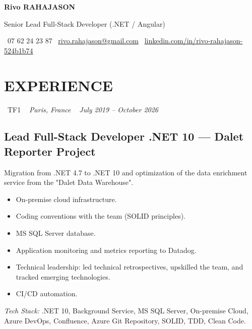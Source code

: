 \documentclass[10pt,a4paper]{article}
\begin{document}
\begin{center}
{\Huge \textbf{\color{ink}Rivo RAHAJASON}}

\vspace{4pt}

{\large \color{primary} Senior Lead Full-Stack Developer (.NET / Angular)}

\vspace{6pt}

\color{darkgray} \faPhone\  07 62 24 23 87 \quad
\color{darkgray} \faEnvelope\ \href{mailto:rivo.rahajason@gmail.com}{rivo.rahajason@gmail.com} \quad
\color{darkgray} \faLinkedin\ \href{https://linkedin.com/in/rivo-rahajason-524b1b74}{linkedin.com/in/rivo-rahajason-524b1b74}

\vspace{22pt}
\end{center}

\section*{EXPERIENCE}

\noindent\textcolor{primary}{ \faBuilding\ TF1} \quad
\textit{ \small \textcolor{darkgray}{ \faMapMarker\ } Paris, France } \hfill
\textit{ \small \textcolor{darkgray}{ \faCalendar\ } July 2019 -- October 2026 }

\vspace{4pt}

\subsection*{Lead Full-Stack Developer .NET 10 --- Dalet Reporter Project}
\color{darkgray}
Migration from .NET 4.7 to .NET 10 and optimization of the data enrichment service from the "Dalet Data Warehouse".
\begin{itemize}
  \item On-premise cloud infrastructure.
  \item Coding conventions with the team (SOLID principles).
  \item MS SQL Server database.
  \item Application monitoring and metrics reporting to Datadog.
  \item Technical leadership: led technical retrospectives, upskilled the team, and tracked emerging technologies.
  \item CI/CD automation.
\end{itemize}
\textit{Tech Stack:} .NET 10, Background Service, MS SQL Server, On-premise Cloud, Azure DevOps, Confluence, Azure Git Repository, SOLID, TDD, Clean Code.
\end{document}
